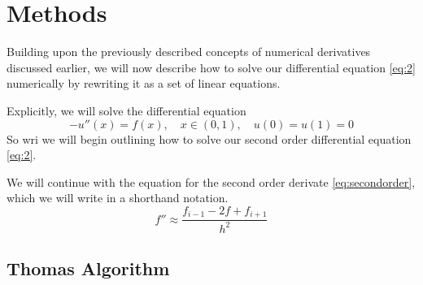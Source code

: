 \section*{Methods} 
Building upon the previously described concepts of numerical derivatives
discussed earlier, we will now describe how to solve our differential
equation \cref{eq:2}  numerically by rewriting it as a set of linear equations.
\par
Explicitly, we will solve the differential equation
\begin{equation*}
  -u''(x) = f(x), \quad x \in (0,1), \quad u(0)=u(1)=0 
\end{equation*} 
So wri
we will begin outlining how to solve our second order differential
equation \cref{eq:2}. \par We will continue with the equation for the
second order derivate \cref{eq:secondorder}, which we will write in a shorthand
notation. \begin{equation}
  f'' \approx \frac{f_{i-1} - 2f + f_{i+1}}{h^2}
\end{equation}

\subsection*{Thomas Algorithm}
